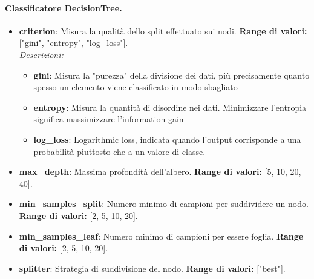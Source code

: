 \noindent\paragraph{Classificatore DecisionTree.}
\begin{itemize}[leftmargin=*]
    \item \textbf{criterion}: Misura la qualità dello split effettuato sui nodi. \textbf{Range di valori:} ["gini", "entropy", "log\_loss"].\\
          \textit{Descrizioni:}
          \begin{itemize}
              \item \textbf{gini}: Misura la "purezza" della divisione dei dati, più precisamente quanto spesso un elemento viene classificato in modo sbagliato
              \item \textbf{entropy}: Misura la quantità di disordine nei dati. Minimizzare l'entropia significa massimizzare l'information gain
              \item \textbf{log\_loss}: Logarithmic loss, indicata quando l'output corrisponde a
              una probabilità piuttosto che a un valore di classe.
          \end{itemize}
    \item \textbf{max\_depth}: Massima profondità dell'albero. \textbf{Range di valori:} [5, 10, 20, 40].
    \item \textbf{min\_samples\_split}: Numero minimo di campioni per suddividere un nodo. \textbf{Range di valori:} [2, 5, 10, 20].
    \item \textbf{min\_samples\_leaf}: Numero minimo di campioni per essere foglia. \textbf{Range di valori:} [2, 5, 10, 20].
    \item \textbf{splitter}: Strategia di suddivisione del nodo. \textbf{Range di valori:} ["best"].
\end{itemize}

